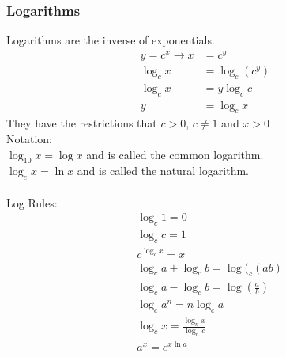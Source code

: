 \documentclass[11pt, fleqn]{article}
\begin{document}
\subsubsection{Logarithms}
Logarithms are the inverse of exponentials.
\begin{align*}
    y=c^x\to x&=c^y\\
    \log_cx&=\log_c(c^y)\\
    \log_cx&=y\log_cc\\
    y&=\log_cx
\end{align*}
They have the restrictions that $c>0$, $c\neq 1$ and $x>0$\\
Notation:\\
$\log_{10}x=\log x$ and is called the common logarithm.\\
$\log_ex=\ln x$ and is called the natural logarithm.\\
\\
Log Rules:
\begin{align*}
    &\log_c1=0\\
    &\log_cc=1\\
    &c^{\log_cx}=x\\
    &\log_ca+\log_cb=\log(_c(ab)\\
    &\log_ca-\log_cb=\log\left(\frac{a}{b}\right)\\
    &\log_ca^n=n\log_ca\\
    &\log_cx=\frac{\log_nx}{\log_nc}\\
    &a^x=e^{x\ln a}
\end{align*}
\end{document}
